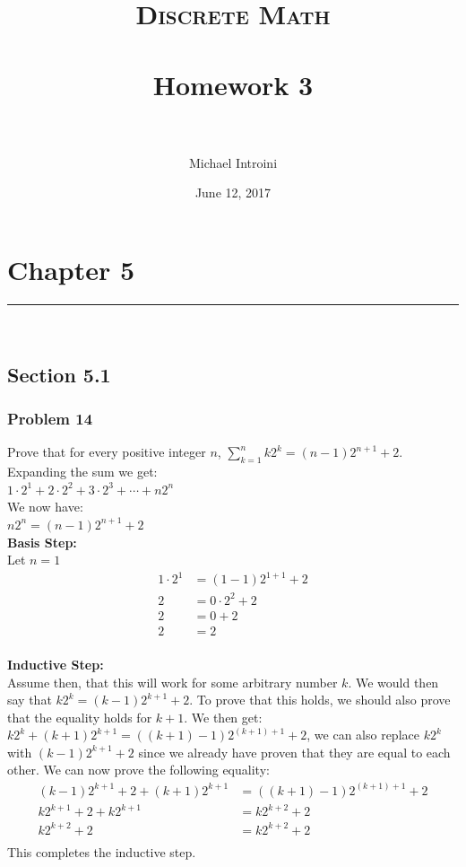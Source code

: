 \documentclass[paper=a4, fontsize=11pt]{scrartcl} %
\title{	
\normalfont \normalsize 
\textsc{Discrete Math} \\ [25pt] %
\horrule{0.5pt} \\[0.2cm] %
\large Homework 3 \\ %
\horrule{2pt} \\[0.2cm] %
}
\author{Michael Introini} %
\date{\normalsize{June 12, 2017}} %
\newcommand{\horrule}[1]{\rule{\linewidth}{#1}} %
\begin{document}
\maketitle %

\section*{Chapter 5}
\horrule{0.5pt} \\ %
\subsection*{Section 5.1}
\subsubsection*{Problem 14}
Prove that for every positive integer $n$, $\displaystyle\sum_{k=1}^{n} k2^k=(n-1)2^{n+1}+2$.\\

Expanding the sum we get: \\
$1\cdot2^1 + 2\cdot2^2 + 3\cdot2^3 + \cdots + n2^n$\\
We now have: \\
$n2^n = (n-1)2^{n+1} + 2$\\ 
\textbf{Basis Step:}\\
Let $n=1$
\begin{align*}
1\cdot 2^1 &= (1-1)2^{1+1} + 2 \nonumber \\
2 &= 0\cdot 2^2 +2 \nonumber \\
2 &= 0 + 2 \nonumber \\ 
2 &= 2 \nonumber \\
\end{align*}

\textbf{Inductive Step:}\\
Assume then, that this will work for some arbitrary number $k$. We would then say that $k2^k = (k-1)2^{k+1} + 2$. To prove that this holds, we should also prove that the equality holds for $k+1$. We then get:\\
$k2^k + (k+1)2^{k+1} = ((k+1)-1)2^{(k+1)+1} + 2$, we can also replace $k2^k$ with $(k-1)2^{k+1} + 2$ since we already have proven that they are equal to each other. We can now prove the following equality:
\begin{align*}
(k-1)2^{k+1} + 2 + (k+1)2^{k+1} &= ((k+1)-1)2^{(k+1)+1} + 2\\
k2^{k+1} + 2 + k2^{k+1} &= k2^{k+2} + 2\\
k2^{k+2} + 2 &= k2^{k+2} + 2\\
\end{align*}
This completes the inductive step.\\
\end{document}
